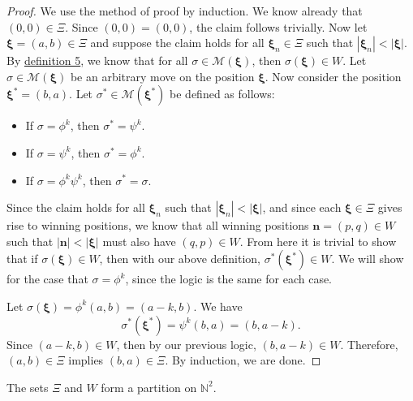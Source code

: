 \documentclass[11pt, letterpaper]{article}
\begin{document}
\begin{proof}
	We use the method of proof by induction. We know already that $(0,0)\in \Xi $. Since $(0,0)=(0,0)$, the claim follows trivially. Now let $\boldsymbol{\xi} =(a,b)\in \Xi $ and suppose the claim holds for all $\boldsymbol{\xi} _n\in \Xi $ such that $\left| \boldsymbol{\xi} _n \right| <\left| \boldsymbol{\xi}  \right| $. By \hyperref[dfn:5]{definition 5}, we know that for all $\sigma \in \mathscr{M} \left( \boldsymbol{\xi}  \right) $, then $\sigma (\boldsymbol{\xi} )\in W$. Let $\sigma \in \mathscr{M} (\boldsymbol{\xi} )$ be an arbitrary move on the position $\boldsymbol{\xi} $. Now consider the position $\boldsymbol{\xi} ^*=(b,a)$. Let $\sigma ^*\in \mathscr{M} \left( \boldsymbol{\xi} ^* \right) $ be defined as follows:
	\begin{itemize}
		\item If $\sigma =\phi ^k$, then $\sigma ^*=\psi ^k$.
		\item If $\sigma =\psi ^k$, then $\sigma ^*=\phi ^k$.
		\item If $\sigma =\phi ^k\psi ^k$, then $\sigma ^*=\sigma $.
	\end{itemize}
	Since the claim holds for all $\boldsymbol{\xi}_{n}$ such that $\left| \boldsymbol{\xi} _{n} \right| <\left| \boldsymbol{\xi}  \right| $, and since each $\boldsymbol{\xi} \in \Xi $ gives rise to winning positions, we know that all winning positions $\mathbf{n}=(p,q)\in W$ such that $\left| \mathbf{n} \right| <\left| \boldsymbol{\xi}  \right| $ must also have $(q,p)\in W$. From here it is trivial to show that if $\sigma (\boldsymbol{\xi} )\in W$, then with our above definition, $\sigma ^*\left( \boldsymbol{\xi} ^* \right) \in W$. We will show for the case that $\sigma =\phi ^k$, since the logic is the same for each case.

	Let $\sigma (\boldsymbol{\xi} )=\phi ^k(a,b)=(a-k,b)$. We have
	\[
		\sigma ^*\left( \boldsymbol{\xi} ^* \right) =\psi ^k\left( b,a \right) =(b,a-k)
	.\]
	Since $(a-k,b)\in W$, then by our previous logic, $(b,a-k)\in W$. Therefore, $(a,b)\in \Xi $ implies $(b,a)\in \Xi $. By induction, we are done.
\end{proof}
\begin{theorem}\label{thm:3}
	The sets $\Xi $ and $W$ form a partition on $\mathbb{N}^2$.
\end{theorem}
\end{document}

